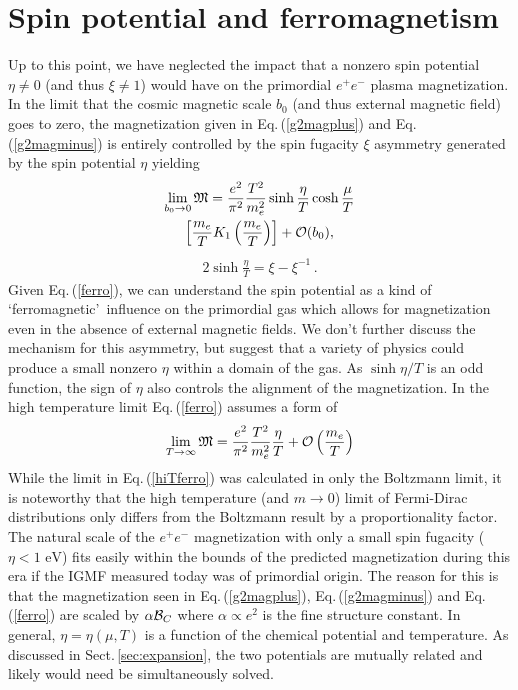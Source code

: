 \documentclass[reprint]{revtex4-2}
\newcommand*{\eV}{\text{ eV}}
\newcommand{\req}[1]{Eq.\,(\ref{#1})}
\newcommand{\rsec}[1]{Sect.\,{\ref{#1}}}
\begin{document}
\section{Spin potential and ferromagnetism}
\label{sec:ferro}
\noindent Up to this point, we have neglected the impact that a nonzero spin potential $\eta\neq0$ (and thus $\xi\neq1$) would have on the primordial $e^{+}e^{-}$ plasma magnetization. In the limit that the cosmic magnetic scale $b_{0}$ (and thus external magnetic field) goes to zero, the magnetization given in \req{g2magplus} and \req{g2magminus} is entirely controlled by the spin fugacity $\xi$ asymmetry generated by the spin potential $\eta$ yielding
\begin{multline}
    \label{ferro}
    \lim_{b_{0}\rightarrow0}{\mathfrak M}=\frac{e^{2}}{\pi^{2}}\frac{T^{2}}{m_{e}^{2}}\sinh{\frac{\eta}{T}}\cosh{\frac{\mu}{T}}\\
    \left[\frac{m_{e}}{T}K_{1}\left(\frac{m_{e}}{T}\right)\right]+{\cal O}(b_{0}),
\end{multline}
\begin{align}
    \label{asymmetry}
    2\sinh{\frac{\eta}{T}}=\xi-\xi^{-1}\,.
\end{align}
Given \req{ferro}, we can understand the spin potential as a kind of \lq ferromagnetic\rq\ influence on the primordial gas which allows for magnetization even in the absence of external magnetic fields. We don't further discuss the mechanism for this asymmetry, but suggest that a variety of physics could produce a small nonzero $\eta$ within a domain of the gas. As $\sinh{\eta/T}$ is an odd function, the sign of $\eta$ also controls the alignment of the magnetization. In the high temperature limit \req{ferro} assumes a form of
\begin{align}
    \label{hiTferro}
    \lim_{T\rightarrow\infty}{\mathfrak M}=\frac{e^{2}}{\pi^{2}}\frac{T^{2}}{m_{e}^{2}}\frac{\eta}{T}+{\cal O}\left(\frac{m_{e}}{T}\right)
\end{align}
While the limit in \req{hiTferro} was calculated in only the Boltzmann limit, it is noteworthy that the high temperature (and $m\rightarrow0$) limit of Fermi-Dirac distributions only differs from the Boltzmann result by a proportionality factor. The natural scale of the $e^{+}e^{-}$ magnetization with only a small spin fugacity ($\eta<1\eV$) fits easily within the bounds of the predicted magnetization during this era if the IGMF measured today was of primordial origin. The reason for this is that the magnetization seen in \req{g2magplus}, \req{g2magminus} and \req{ferro} are scaled by $\alpha{\cal B}_{C}$ where $\alpha\propto e^{2}$ is the fine structure constant. In general, $\eta=\eta(\mu,T)$ is a function of the chemical potential and temperature. As discussed in \rsec{sec:expansion}, the two potentials are mutually related and likely would need be simultaneously solved.
\end{document}
